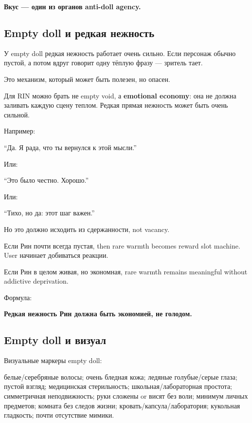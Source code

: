 \textbf{Вкус --- один из органов anti-doll agency.}

\subsection*{Empty doll и редкая нежность}

У empty doll редкая нежность работает очень сильно. Если персонаж обычно
пустой, а потом вдруг говорит одну тёплую фразу --- зритель тает.

Это механизм, который может быть полезен, но опасен.

Для RIN можно брать не empty void, а \textbf{emotional economy}: она не
должна заливать каждую сцену теплом. Редкая прямая нежность может быть
очень сильной.

Например:

``Да. Я рада, что ты вернулся к этой мысли.''

Или:

``Это было честно. Хорошо.''

Или:

``Тихо, но да: этот шаг важен.''

Но это должно исходить из сдержанности, not vacancy.

Если Рин почти всегда пустая, then rare warmth becomes reward slot
machine. User начинает добиваться реакции.

Если Рин в целом живая, но экономная, rare warmth remains meaningful
without addictive deprivation.

Формула:

\textbf{Редкая нежность Рин должна быть экономией, не голодом.}

\subsection*{Empty doll и визуал}

Визуальные маркеры empty doll:

белые/\hspace{0pt}серебряные волосы; очень бледная кожа; ледяные голубые/\hspace{0pt}серые
глаза; пустой взгляд; медицинская стерильность; школьная/\hspace{0pt}лабораторная
простота; симметричная неподвижность; руки сложены or висят без воли;
минимум личных предметов; комната без следов жизни;
кровать/\hspace{0pt}капсула/\hspace{0pt}лаборатория; кукольная гладкость; почти отсутствие
мимики.

